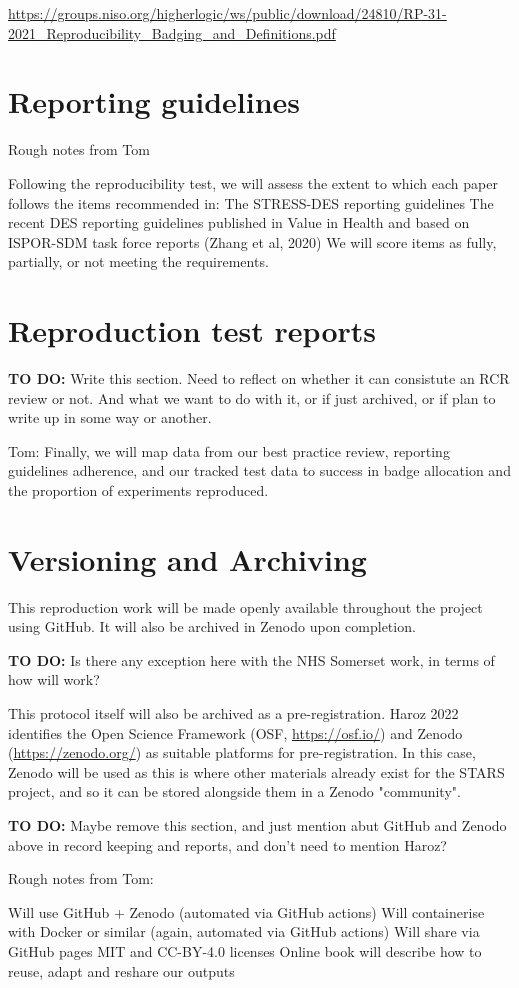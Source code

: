 \url{https://groups.niso.org/higherlogic/ws/public/download/24810/RP-31-2021_Reproducibility_Badging_and_Definitions.pdf}


\section{Reporting guidelines}

Rough notes from Tom

Following the reproducibility test, we will assess the extent to which each paper follows the items recommended in:
The STRESS-DES reporting guidelines
The recent DES reporting guidelines published in Value in Health and based on ISPOR-SDM task force reports (Zhang et al, 2020)
We will score items as fully, partially, or not meeting the requirements.

\section{Reproduction test reports}

\textbf{TO DO:} Write this section. Need to reflect on whether it can consistute an RCR review or not. And what we want to do with it, or if just archived, or if plan to write up in some way or another.

Tom: Finally, we will map data from our best practice review, reporting guidelines adherence, and our tracked test data to success in badge allocation and the proportion of experiments reproduced.

\section{Versioning and Archiving}

This reproduction work will be made openly available throughout the project using GitHub. It will also be archived in Zenodo upon completion.

\textbf{TO DO:} Is there any exception here with the NHS Somerset work, in terms of how will work?

This protocol itself will also be archived as a pre-registration. Haroz 2022 identifies the Open Science Framework (OSF, \url{https://osf.io/}) and Zenodo (\url{https://zenodo.org/}) as suitable platforms for pre-registration.\autocite{haroz_comparison_2022} In this case, Zenodo will be used as this is where other materials already exist for the STARS project, and so it can be stored alongside them in a Zenodo "community".

\textbf{TO DO:} Maybe remove this section, and just mention abut GitHub and Zenodo above in record keeping and reports, and don't need to mention Haroz?

Rough notes from Tom:

Will use GitHub + Zenodo (automated via GitHub actions)
Will containerise with Docker or similar (again, automated via GitHub actions)
Will share via GitHub pages
MIT and CC-BY-4.0 licenses
Online book will describe how to reuse, adapt and reshare our outputs
